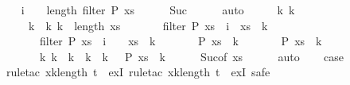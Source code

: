 \begin{isabellebody}
\isanewline
\ \ \isamarkupfalse%
\ {\isachardoublequoteopen}i\ {\isacharplus}\ {}\ {\isacharless}\ length\ {\isacharparenleft}filter\ P\ {\isacharquery}xs{\isacharparenright}{\isachardoublequoteclose}\isanewline
\ \ \ \ \isamarkupfalse%
\ Suc{\isacharparenleft}{}{\isacharparenright}\isanewline
\ \ \ \ \isamarkupfalse%
\ auto\isanewline
\ \ \isamarkupfalse%
\ \isamarkupfalse%
\ k{}\ k{}\isanewline
\ \ \ \ \ {\isachardoublequoteopen}k{}\ {\isacharless}\ k{}{\isachardoublequoteclose}\ {\isachardoublequoteopen}k{}\ {\isacharless}\ length\ {\isacharquery}xs{\isachardoublequoteclose}\isanewline
\ \ \ \ \ \ \ {\isachardoublequoteopen}filter\ P\ {\isacharquery}xs\ {\isacharbang}\ i\ {\isacharequal}\ {\isacharquery}xs\ {\isacharbang}\ k{}{\isachardoublequoteclose}\isanewline
\ \ \ \ \ \ \ {\isachardoublequoteopen}filter\ P\ {\isacharquery}xs\ {\isacharbang}\ {\isacharparenleft}i\ {\isacharplus}\ {}{\isacharparenright}\ {\isacharequal}\ {\isacharquery}xs\ {\isacharbang}\ k{}{\isachardoublequoteclose}\isanewline
\ \ \ \ \ \ \ {\isachardoublequoteopen}P\ {\isacharparenleft}{\isacharquery}xs\ {\isacharbang}\ k{}{\isacharparenright}{\isachardoublequoteclose}\isanewline
\ \ \ \ \ \ \ {\isachardoublequoteopen}P\ {\isacharparenleft}{\isacharquery}xs\ {\isacharbang}\ k{}{\isacharparenright}{\isachardoublequoteclose}\ \isanewline
\ \ \ \ \ \ \ {\isachardoublequoteopen}{\isasymforall}k{\isacharprime}{\isachardot}\ k{}\ {\isacharless}\ k{\isacharprime}\ {\isasymand}\ k{\isacharprime}\ {\isacharless}\ k{}\ {\isasymlongrightarrow}\ {\isasymnot}\ P\ {\isacharparenleft}{\isacharquery}xs\ {\isacharbang}\ k{\isacharprime}{\isacharparenright}{\isachardoublequoteclose}\isanewline
\ \ \ \ \isamarkupfalse%
\ Suc{\isacharparenleft}{}{\isacharparenright}{\isacharbrackleft}of\ {\isacharquery}xs{\isacharbrackright}\isanewline
\ \ \ \ \isamarkupfalse%
\ auto\isanewline
\ \ \isamarkupfalse%
\ {\isacharquery}case\isanewline
\ \ \isamarkupfalse%
\ {\isacharparenleft}rule{\isacharunderscore}tac\ x{\isacharequal}{\isachardoublequoteopen}k{}{\isacharplus}length\ {\isacharquery}t{\isacharplus}{}{\isachardoublequoteclose}\ \ exI{\isacharcomma}\ rule{\isacharunderscore}tac\ x{\isacharequal}{\isachardoublequoteopen}k{}{\isacharplus}length\ {\isacharquery}t{\isacharplus}{}{\isachardoublequoteclose}\ \ exI{\isacharcomma}\ safe{\isacharparenright}\isanewline

\end{isabellebody}
